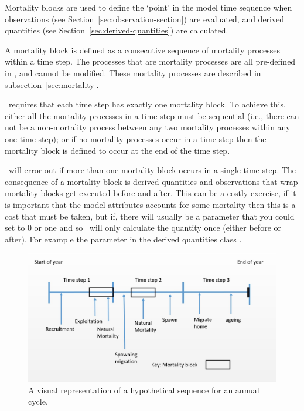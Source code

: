 Mortality blocks are used to define the `point' in the model time sequence when observations (see Section~\ref{sec:observation-section}) are evaluated, and derived quantities (see Section~\ref{sec:derived-quantities}) are calculated.

A mortality block is defined as a consecutive sequence of mortality processes within a time step. The processes that are mortality processes are all pre-defined in \IBM, and cannot be modified. These mortality processes are described in subsection~\ref{sec:mortality}. 

\IBM\ requires that each time step has exactly one mortality block. To achieve this, either all the mortality processes in a time step must be sequential (i.e., there can not be a non-mortality process between any two mortality processes within any one time step); or if no mortality processes occur in a time step then the mortality block is defined to occur at the end of the time step. 

\IBM\ will error out if more than one mortality block occurs in a single time step. The consequence of a mortality block is derived quantities and observations that wrap mortality blocks get executed before and after. This can be a costly exercise, if it is important that the model attributes accounts for some mortality then this is a cost that must be taken, but if, there will usually be a parameter that you could set to 0 or one and so \IBM\ will only calculate the quantity once (either before or after). For example the parameter in the derived quantities class .

\begin{figure}[H]
	\centering
	\includegraphics[scale=0.5]{Figures/annual_cycle.jpg}
	\caption{A visual representation of a hypothetical sequence for an annual cycle.}\label{Fig:annual}
\end{figure}

